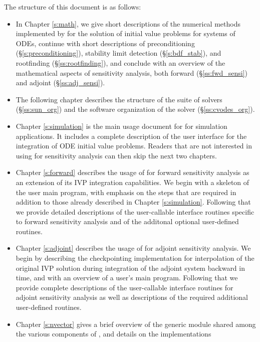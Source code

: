 The structure of this document is as follows:
\begin{itemize}
\item
  In Chapter \ref{s:math}, we give short descriptions of the numerical
  methods implemented by {\cvodes} for the solution of initial value
  problems for systems of ODEs, continue with short descriptions of
  preconditioning (\S\ref{s:preconditioning}), stability limit detection
  (\S\ref{s:bdf_stab}), and rootfinding (\S\ref{ss:rootfinding}),
  and conclude with an overview of the mathematical aspects of sensitivity
  analysis, both forward (\S\ref{ss:fwd_sensi}) and adjoint (\S\ref{ss:adj_sensi}).
\item
  The following chapter describes the structure of the {\sundials} suite
  of solvers (\S\ref{ss:sun_org}) and the software organization of the {\cvodes}
  solver (\S\ref{ss:cvodes_org}).
\item
  Chapter \ref{s:simulation} is the main usage document for {\cvodes}
  for simulation applications.  It includes a complete description of
  the user interface for the integration of ODE initial value problems.
  Readers that are not interested in using {\cvodes} for sensitivity
  analysis can then skip the next two chapters.
\item
  Chapter \ref{s:forward} describes the usage of {\cvodes} for forward
  sensitivity analysis as an extension of its IVP integration
  capabilities.  We begin with a skeleton of the user main program,
  with emphasis on the steps that are required in addition to those
  already described in Chapter \ref{s:simulation}.  Following that we
  provide detailed descriptions of the user-callable interface
  routines specific to forward sensitivity analysis and of the
  additonal optional user-defined routines.
\item
  Chapter \ref{s:adjoint} describes the usage of {\cvodes} for adjoint
  sensitivity analysis. We begin by describing the {\cvodes} checkpointing
  implementation for interpolation of the original IVP solution during
  integration of the adjoint system backward in time, and with
  an overview of a user's main program. Following that we provide complete
  descriptions of the user-callable interface routines for adjoint sensitivity
  analysis as well as descriptions of the required additional user-defined routines.
\item
  Chapter \ref{s:nvector} gives a brief overview of the generic
  {\nvector} module shared among the various components of
  {\sundials}, and details on the {\nvector} implementations

\end{itemize}
